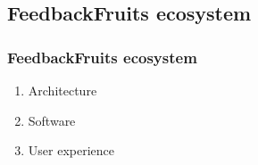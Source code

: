 \subsection{FeedbackFruits ecosystem}
\begin{frame}\frametitle{FeedbackFruits ecosystem}
    \begin{enumerate}
        \item Architecture
        \item Software
        \item User experience
    \end{enumerate}
\end{frame}